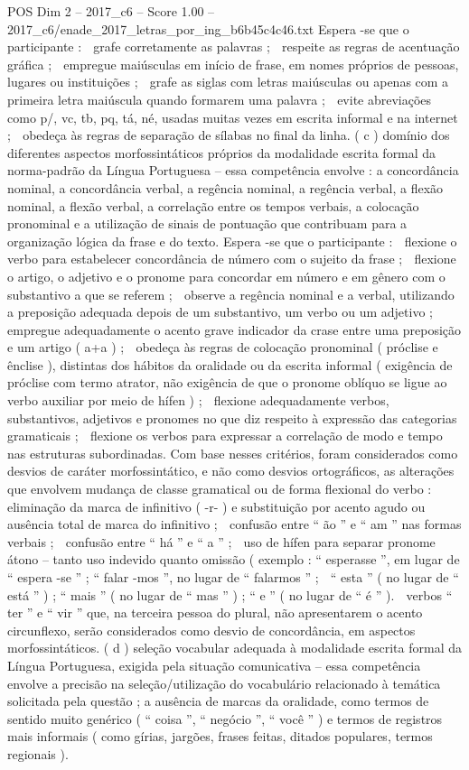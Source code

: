 \begin{textsample}{POS Dim 2 – 2017\_c6 – Score 1.00 – 2017\_c6/enade\_2017\_letras\_por\_ing\_b6b45c4c46.txt}
Espera -se que o participante :  grafe corretamente as palavras ;  respeite as regras de acentuação gráfica ;  empregue maiúsculas em início de frase, em nomes próprios de pessoas, lugares ou instituições ;  grafe as siglas com letras maiúsculas ou apenas com a primeira letra maiúscula quando formarem uma palavra ;  evite abreviações como p/, vc, tb, pq, tá, né, usadas muitas vezes em escrita informal e na internet ;  obedeça às regras de separação de sílabas no final da linha. ( c ) domínio dos diferentes aspectos morfossintáticos próprios da modalidade escrita formal da norma-padrão da Língua Portuguesa – essa competência envolve : a concordância nominal, a concordância verbal, a regência nominal, a regência verbal, a flexão nominal, a flexão verbal, a correlação entre os tempos verbais, a colocação pronominal e a utilização de sinais de pontuação que contribuam para a organização lógica da frase e do texto.
Espera -se que o participante :  flexione o verbo para estabelecer concordância de número com o sujeito da frase ;  flexione o artigo, o adjetivo e o pronome para concordar em número e em gênero com o substantivo a que se referem ;  observe a regência nominal e a verbal, utilizando a preposição adequada depois de um substantivo, um verbo ou um adjetivo ;  empregue adequadamente o acento grave indicador da crase entre uma preposição e um artigo ( a+a ) ;  obedeça às regras de colocação pronominal ( próclise e ênclise ), distintas dos hábitos da oralidade ou da escrita informal ( exigência de próclise com termo atrator, não exigência de que o pronome oblíquo se ligue ao verbo auxiliar por meio de hífen ) ;  flexione adequadamente verbos, substantivos, adjetivos e pronomes no que diz respeito à expressão das categorias gramaticais ;  flexione os verbos para expressar a correlação de modo e tempo nas estruturas subordinadas.
Com base nesses critérios, foram considerados como desvios de caráter morfossintático, e não como desvios ortográficos, as alterações que envolvem mudança de classe gramatical ou de forma flexional do verbo :  eliminação da marca de infinitivo ( -r- ) e substituição por acento agudo ou ausência total de marca do infinitivo ;  confusão entre “ ão ” e “ am ” nas formas verbais ;  confusão entre “ há ” e “ a ” ;  uso de hífen para separar pronome átono – tanto uso indevido quanto omissão ( exemplo : “ esperasse ”, em lugar de “ espera -se ” ; “ falar -mos ”, no lugar de “ falarmos ” ;  “ esta ” ( no lugar de “ está ” ) ; “ mais ” ( no lugar de “ mas ” ) ; “ e ” ( no lugar de “ é ” ).  verbos “ ter ” e “ vir ” que, na terceira pessoa do plural, não apresentarem o acento circunflexo, serão considerados como desvio de concordância, em aspectos morfossintáticos. ( d ) seleção vocabular adequada à modalidade escrita formal da Língua Portuguesa, exigida pela situação comunicativa – essa competência envolve a precisão na seleção/utilização do vocabulário relacionado à temática solicitada pela questão ; a ausência de marcas da oralidade, como termos de sentido muito genérico ( “ coisa ”, “ negócio ”, “ você ” ) e termos de registros mais informais ( como gírias, jargões, frases feitas, ditados populares, termos regionais ).

\end{textsample}
